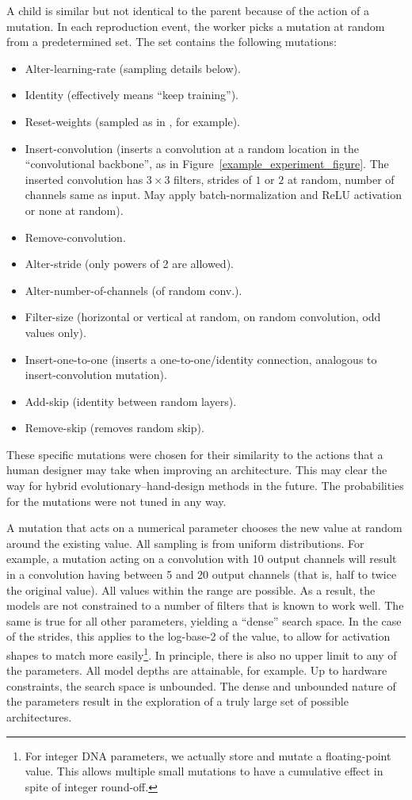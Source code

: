\documentclass{article}
\begin{document}
A child is similar but not identical to the parent because of the action of a mutation. In each reproduction event, the worker picks a mutation at random from a predetermined set. The set contains the following mutations:
\begin{itemize}[noitemsep,topsep=0pt,leftmargin=*]
    \item {\sc Alter-learning-rate} (sampling details below).
    \item {\sc Identity} (effectively means ``keep training'').
    \item {\sc Reset-weights} (sampled as in \citet{he2015delving}, for example).
    \item {\sc Insert-convolution} (inserts a convolution at a random location in the ``convolutional backbone'', as in Figure~\ref{example_experiment_figure}. The inserted convolution has $3 \times 3$ filters, strides of $1$ or $2$ at random, number of channels same as input. May apply batch-normalization and ReLU activation or none at random).
    \item {\sc Remove-convolution}.
    \item {\sc Alter-stride} (only powers of 2 are allowed).
    \item {\sc Alter-number-of-channels} (of random conv.).
    \item {\sc Filter-size} (horizontal or vertical at random, on random convolution, odd values only).
    \item {\sc Insert-one-to-one} (inserts a one-to-one/identity connection, analogous to insert-convolution mutation).
    \item {\sc Add-skip} (identity between random layers).
    \item {\sc Remove-skip} (removes random skip).
\end{itemize}
These specific mutations were chosen for their similarity to the actions that a human designer may take when improving an architecture. This may clear the way for hybrid evolutionary--hand-design methods in the future. The probabilities for the mutations were not tuned in any way.

A mutation that acts on a numerical parameter chooses the new value at random around the existing value. All sampling is from uniform distributions. For example, a mutation acting on a convolution with 10 output channels will result in a convolution having between 5 and 20 output channels (that is, half to twice the original value). All values within the range are possible. As a result, the models are not constrained to a number of filters that is known to work well. The same is true for all other parameters, yielding a ``dense'' search space. In the case of the strides, this applies to the log-base-2 of the value, to allow for activation shapes to match more easily\footnote{For integer DNA parameters, we actually store and mutate a floating-point value. This allows multiple small mutations to have a cumulative effect in spite of integer round-off.}. In principle, there is also no upper limit to any of the parameters. All model depths are attainable, for example. Up to hardware constraints, the search space is unbounded. The dense and unbounded nature of the parameters result in the exploration of a truly large set of possible architectures.
\end{document}
